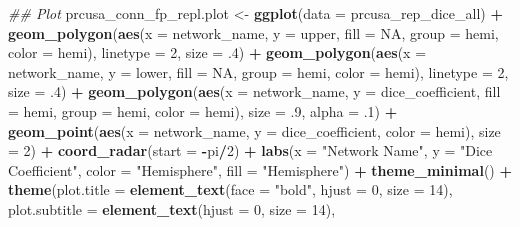 \documentclass[
]{article}
\newenvironment{Shaded}{\begin{snugshade}}{\end{snugshade}}
\newcommand{\CommentTok}[1]{\textcolor[rgb]{0.56,0.35,0.01}{\textit{#1}}}
\newcommand{\DataTypeTok}[1]{\textcolor[rgb]{0.13,0.29,0.53}{#1}}
\newcommand{\DecValTok}[1]{\textcolor[rgb]{0.00,0.00,0.81}{#1}}
\newcommand{\FloatTok}[1]{\textcolor[rgb]{0.00,0.00,0.81}{#1}}
\newcommand{\KeywordTok}[1]{\textcolor[rgb]{0.13,0.29,0.53}{\textbf{#1}}}
\newcommand{\NormalTok}[1]{#1}
\newcommand{\OperatorTok}[1]{\textcolor[rgb]{0.81,0.36,0.00}{\textbf{#1}}}
\newcommand{\OtherTok}[1]{\textcolor[rgb]{0.56,0.35,0.01}{#1}}
\newcommand{\StringTok}[1]{\textcolor[rgb]{0.31,0.60,0.02}{#1}}
\begin{document}
\begin{Shaded}
\begin{Highlighting}[]
{{\CommentTok{## Plot}
\NormalTok{prcusa_conn_fp_repl.plot <-}\StringTok{ }\KeywordTok{ggplot}\NormalTok{(}\DataTypeTok{data =}\NormalTok{ prcusa_rep_dice_all) }\OperatorTok{+}\StringTok{  }
\StringTok{  }\KeywordTok{geom_polygon}\NormalTok{(}\KeywordTok{aes}\NormalTok{(}\DataTypeTok{x =}\NormalTok{ network_name, }\DataTypeTok{y =}\NormalTok{ upper, }\DataTypeTok{fill =} \OtherTok{NA}\NormalTok{, }\DataTypeTok{group =}\NormalTok{ hemi, }\DataTypeTok{color =}\NormalTok{ hemi), }
              \DataTypeTok{linetype =} \DecValTok{2}\NormalTok{, }\DataTypeTok{size =} \FloatTok{.4}\NormalTok{) }\OperatorTok{+}\StringTok{ }
\StringTok{  }\KeywordTok{geom_polygon}\NormalTok{(}\KeywordTok{aes}\NormalTok{(}\DataTypeTok{x =}\NormalTok{ network_name, }\DataTypeTok{y =}\NormalTok{ lower, }\DataTypeTok{fill =} \OtherTok{NA}\NormalTok{, }\DataTypeTok{group =}\NormalTok{ hemi, }\DataTypeTok{color =}\NormalTok{ hemi), }
              \DataTypeTok{linetype =} \DecValTok{2}\NormalTok{, }\DataTypeTok{size =} \FloatTok{.4}\NormalTok{) }\OperatorTok{+}
\StringTok{  }\KeywordTok{geom_polygon}\NormalTok{(}\KeywordTok{aes}\NormalTok{(}\DataTypeTok{x =}\NormalTok{ network_name, }\DataTypeTok{y =}\NormalTok{ dice_coefficient, }\DataTypeTok{fill =}\NormalTok{ hemi, }\DataTypeTok{group =}\NormalTok{ hemi, }\DataTypeTok{color =}\NormalTok{ hemi), }
               \DataTypeTok{size =} \FloatTok{.9}\NormalTok{, }\DataTypeTok{alpha =} \FloatTok{.1}\NormalTok{) }\OperatorTok{+}
\StringTok{  }\KeywordTok{geom_point}\NormalTok{(}\KeywordTok{aes}\NormalTok{(}\DataTypeTok{x =}\NormalTok{ network_name, }\DataTypeTok{y =}\NormalTok{ dice_coefficient, }\DataTypeTok{color =}\NormalTok{ hemi), }\DataTypeTok{size =} \DecValTok{2}\NormalTok{) }\OperatorTok{+}\StringTok{ }
\StringTok{  }\KeywordTok{coord_radar}\NormalTok{(}\DataTypeTok{start =} \OperatorTok{-}\NormalTok{pi}\OperatorTok{/}\DecValTok{2}\NormalTok{) }\OperatorTok{+}
\StringTok{  }\KeywordTok{labs}\NormalTok{(}\DataTypeTok{x =} \StringTok{"Network Name"}\NormalTok{,}
       \DataTypeTok{y =} \StringTok{"Dice Coefficient"}\NormalTok{,}
       \DataTypeTok{color =} \StringTok{"Hemisphere"}\NormalTok{,}
       \DataTypeTok{fill =} \StringTok{"Hemisphere"}\NormalTok{) }\OperatorTok{+}\StringTok{  }
\StringTok{    }\KeywordTok{theme_minimal}\NormalTok{() }\OperatorTok{+}
\StringTok{  }\KeywordTok{theme}\NormalTok{(}\DataTypeTok{plot.title =} \KeywordTok{element_text}\NormalTok{(}\DataTypeTok{face =} \StringTok{"bold"}\NormalTok{, }\DataTypeTok{hjust =} \DecValTok{0}\NormalTok{, }\DataTypeTok{size =} \DecValTok{14}\NormalTok{), }
        \DataTypeTok{plot.subtitle =} \KeywordTok{element_text}\NormalTok{(}\DataTypeTok{hjust =} \DecValTok{0}\NormalTok{, }\DataTypeTok{size =} \DecValTok{14}\NormalTok{),}
}}
\end{Highlighting}
\end{Shaded}
\end{document}
